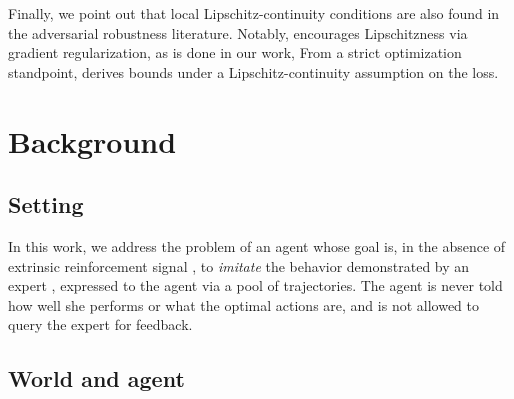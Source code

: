 Finally, we point out that local Lipschitz-continuity conditions are
also found in the adversarial robustness literature.
Notably, \cite{Finlay2018-is} encourages Lipschitzness via gradient regularization, as is done in our work,
From a strict optimization standpoint, \cite{Hardt2015-qf}
derives bounds under a Lipschitz-continuity assumption on the loss.

\section{Background}

\subsection*{Setting}

In this work, we address the problem of an agent whose goal is,
in the absence of extrinsic reinforcement signal \cite{Singh2009-cm},
to \emph{imitate} the behavior demonstrated by an expert \cite{Bagnell2015-ni},
expressed to the agent via a pool of trajectories.
The agent is never told how well she performs or what the optimal actions are,
and is not allowed to query the expert for feedback.

\subsection*{World and agent}
\label{prelim}

